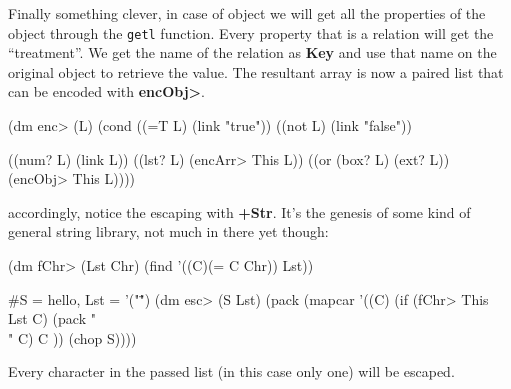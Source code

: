 Finally something clever, in case of object we will get all the
properties of the object through the \texttt{getl} function. Every
property that is a relation will get the ``treatment''. We get the
name of the relation as \textbf{Key} and use that name on the original
object to retrieve the value. The resultant array is now a paired list
that can be encoded with \textbf{encObj\textgreater{}}.


\begin{wideverbatim}
(dm enc> (L)   
   (cond 
      ((=T L)    (link "true"))
      ((not L)   (link "false"))

      ((num? L)  (link L))
      ((lst? L)  (encArr> This L))
      ((or (box? L) (ext? L)) (encObj> This L))))
\end{wideverbatim}

accordingly, notice the escaping with \textbf{+Str}. It's the genesis of some
kind of general string library, not much in there yet though:

\begin{wideverbatim}

(dm fChr> (Lst Chr)
  (find '((C)(= C Chr)) Lst))
   
#S = hello, Lst = '("\"")
(dm esc> (S Lst)
  (pack 
     (mapcar 
        '((C)
            (if (fChr> This Lst C) (pack "\\" C) C )) (chop S))))
\end{wideverbatim}

Every character in the passed list (in this case only one) will be
escaped.

